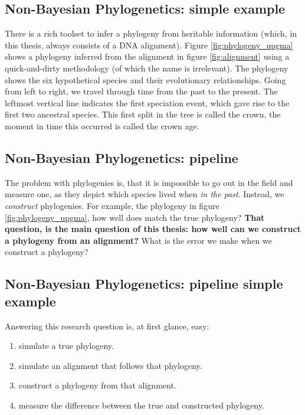 \subsection{Non-Bayesian Phylogenetics: simple example}

There is a rich toolset to infer a phylogeny from heritable 
information (which, in this thesis, always consists of a DNA alignment).
Figure \ref{fig:phylogeny_upgma} shows a phylogeny inferred
from the alignment 
in figure \ref{fig:alignment} using a quick-and-dirty methodology (of
which the name is irrelevant).
The phylogeny shows the six hypothetical species and their evolutionary 
relationships. Going from left to right, we travel through time from 
the past to the present. 
The leftmost vertical line indicates the first speciation event, 
which gave rise to the first two ancestral species. 
This first split in the tree is called the crown,
the moment in time this occurred is called the crown age.

\subsection{Non-Bayesian Phylogenetics: pipeline}

The problem with phylogenies is, 
that it is impossible to go out in the field and measure one, 
as they depict which species lived when \emph{in the past}.
Instead, we \emph{construct} phylogenies. For example,
the phylogeny in figure \ref{fig:phylogeny_upgma}, how well
does match the true phylogeny? \textbf{That question, is the main question of this 
thesis: how well can we construct a
phylogeny from an alignment?} What is the error we
make when we construct a phylogeny?

\subsection{Non-Bayesian Phylogenetics: pipeline simple example}

Answering this research question is, at first glance, easy: 

\begin{enumerate}[label=\arabic*)]\itemsep2pt
  \item simulate a true phylogeny.
  \item simulate an alignment that follows that phylogeny.
  \item construct a phylogeny from that alignment.
  \item measure the difference between the true and constructed phylogeny.
\end{enumerate}

